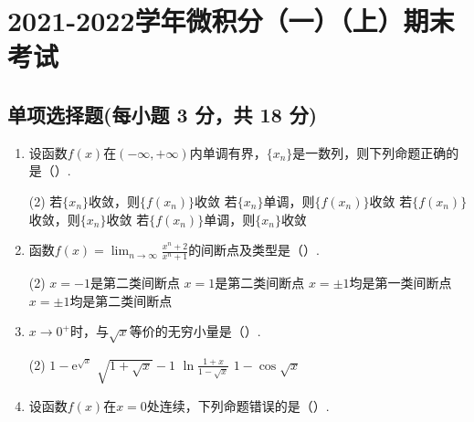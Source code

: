 \documentclass[../main.tex]{subfiles}
\begin{document}
\chapter{2021-2022学年微积分（一）（上）期末考试}

\section{单项选择题(每小题 3 分，共 18 分)}
\begin{enumerate}
    \item 设函数$f(x)$在$(-\infty,+\infty)$内单调有界，$\{x_{n}\}$是一数列，则下列命题正确的是（\qquad）.

          \begin{tasks}[label=\textbf{\Alph*.}, label-width=1.5em, column-sep=1em](2)
              \task 若$\{x_{n}\}$收敛，则$\{f(x_{n})\}$收敛
              \task 若$\{x_{n}\}$单调，则$\{f(x_{n})\}$收敛
              \task 若$\{f(x_{n})\}$收敛，则$\{x_{n}\}$收敛
              \task 若$\{f(x_{n})\}$单调，则$\{x_{n}\}$收敛
          \end{tasks}
          \vspace{1em}

    \item 函数$f(x)=\lim_{n\to\infty}\frac{x^{n}+2}{x^{n}+1}$的间断点及类型是（\qquad）.

          \begin{tasks}[label=\textbf{\Alph*.}, label-width=1.5em, column-sep=1em](2)
              \task $x=-1$是第二类间断点
              \task $x=1$是第二类间断点
              \task $x=\pm1$均是第一类间断点
              \task $x=\pm 1$均是第二类间断点
          \end{tasks}
          \vspace{1em}

    \item $x\to0^{+}$时，与$\sqrt{x}$等价的无穷小量是（\qquad）.

          \begin{tasks}[label=\textbf{\Alph*.}, label-width=1.5em, column-sep=1em](2)
              \task $1-\mathrm{e}^{\sqrt{x}}$
              \task $\sqrt{1+\sqrt{x}}-1$
              \task $\ln\frac{1+x}{1-\sqrt{x}}$
              \task $1-\cos{\sqrt{x}}$
          \end{tasks}
          \vspace{1em}

    \item 设函数$f(x)$在$x=0$处连续，下列命题错误的是（\qquad）.


\end{enumerate}
\end{document}
